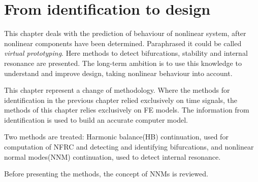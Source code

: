 
\chapter{From identification to design}
\label{chap:ident_to_design}

This chapter deals with the prediction of behaviour of nonlinear system, after
nonlinear components have been determined. Paraphrased it could be called
\textit{virtual prototyping}. Here methods to detect bifurcations, stability and
internal resonance are presented. The long-term ambition is to use this
knowledge to understand and improve design, taking nonlinear behaviour into
account.


This chapter represent a change of methodology. Where the methods for
identification in the previous chapter relied exclusively on time signals, the
methods of this chapter relies exclusively on FE models.
The information from identification is used to build
an accurate computer model.

Two methods are treated: Harmonic balance(HB) continuation, used for computation
of NFRC and detecting and identifying bifurcations, and nonlinear normal
modes(NNM) continuation, used to detect internal resonance.

Before presenting the methods, the concept of NNMs is reviewed.





